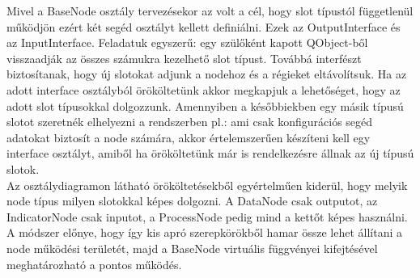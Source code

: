 \documentclass[a4paper,12pt,oneside]{report}
\begin{document}
Mivel a BaseNode osztály tervezésekor az volt a cél, hogy slot típustól függetlenül működjön ezért két segéd osztályt kellett definiálni. Ezek az OutputInterface és az InputInterface. Feladatuk egyszerű: egy szülőként kapott QObject-ből visszaadják az összes számukra kezelhető slot típust. Továbbá interfészt biztosítanak, hogy új slotokat adjunk a nodehoz és a régieket eltávolítsuk. Ha az adott interface osztályból örököltetünk akkor megkapjuk a lehetőséget, hogy az adott slot típusokkal dolgozzunk. Amennyiben a későbbiekben egy másik típusú slotot szeretnék elhelyezni a rendszerben pl.: ami csak konfigurációs segéd adatokat biztosít a node számára, akkor értelemszerűen készíteni kell egy interface osztályt, amiből ha örököltetünk már is rendelkezésre állnak az új típusú slotok.\\
Az osztálydiagramon látható örököltetésekből egyértelműen kiderül, hogy melyik node típus milyen slotokkal képes dolgozni. A DataNode csak outputot, az IndicatorNode csak inputot, a ProcessNode pedig mind a kettőt képes használni. A módszer előnye, hogy így kis apró szerepkörökből hamar össze lehet állítani a node működési területét, majd a BaseNode virtuális függvényei kifejtésével meghatározható a pontos működés.
\end{document}

